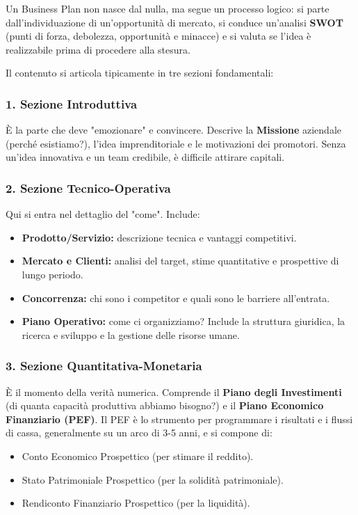 \documentclass[a4paper,10pt]{article}
\begin{document}
Un Business Plan non nasce dal nulla, ma segue un processo logico: si parte dall'individuazione di un'opportunità di mercato, si conduce un'analisi \textbf{SWOT} (punti di forza, debolezza, opportunità e minacce) e si valuta se l'idea è realizzabile prima di procedere alla stesura.

Il contenuto si articola tipicamente in tre sezioni fondamentali:

\subsubsection*{1. Sezione Introduttiva}
È la parte che deve "emozionare" e convincere. Descrive la \textbf{Missione} aziendale (perché esistiamo?), l'idea imprenditoriale e le motivazioni dei promotori. Senza un'idea innovativa e un team credibile, è difficile attirare capitali.

\subsubsection*{2. Sezione Tecnico-Operativa}
Qui si entra nel dettaglio del "come". Include:
\begin{itemize}
    \item \textbf{Prodotto/Servizio:} descrizione tecnica e vantaggi competitivi.
    \item \textbf{Mercato e Clienti:} analisi del target, stime quantitative e prospettive di lungo periodo.
    \item \textbf{Concorrenza:} chi sono i competitor e quali sono le barriere all'entrata.
    \item \textbf{Piano Operativo:} come ci organizziamo? Include la struttura giuridica, la ricerca e sviluppo e la gestione delle risorse umane.
\end{itemize}

\subsubsection*{3. Sezione Quantitativa-Monetaria}
È il momento della verità numerica. Comprende il \textbf{Piano degli Investimenti} (di quanta capacità produttiva abbiamo bisogno?) e il \textbf{Piano Economico Finanziario (PEF)}.
Il PEF è lo strumento per programmare i risultati e i flussi di cassa, generalmente su un arco di 3-5 anni, e si compone di:
\begin{itemize}
    \item Conto Economico Prospettico (per stimare il reddito).
    \item Stato Patrimoniale Prospettico (per la solidità patrimoniale).
    \item Rendiconto Finanziario Prospettico (per la liquidità).
\end{itemize}
\end{document}
